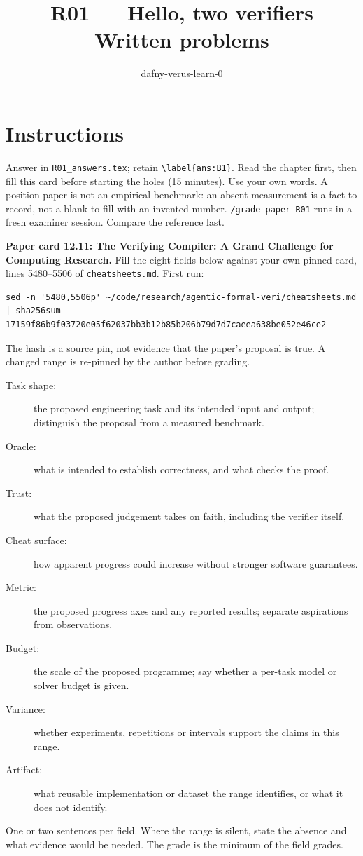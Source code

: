 \documentclass[11pt]{article}
\title{R01 --- Hello, two verifiers \\ \large Written problems}
\author{dafny-verus-learn-0}
\date{}
\begin{document}
\maketitle
\section*{Instructions}
Answer in \texttt{R01\_answers.tex}; retain \verb+\label{ans:B1}+.
Read the chapter first, then fill this card before starting the holes (15 minutes).
Use your own words. A position paper is not an empirical benchmark: an absent
measurement is a fact to record, not a blank to fill with an invented number.
\texttt{/grade-paper R01} runs in a fresh examiner session. Compare the reference last.

\begin{problem}\label{prob:B1}
\textbf{Paper card 12.11: The Verifying Compiler: A Grand Challenge for Computing
Research.} Fill the eight fields below against your own pinned card, lines 5480--5506 of \texttt{cheatsheets.md}. First run:
\begin{verbatim}
sed -n '5480,5506p' ~/code/research/agentic-formal-veri/cheatsheets.md | sha256sum
17159f86b9f03720e05f62037bb3b12b85b206b79d7d7caeea638be052e46ce2  -
\end{verbatim}
The hash is a source pin, not evidence that the paper's proposal is true.
A changed range is re-pinned by the author before grading.
\begin{description}
\item[Task shape:] the proposed engineering task and its intended input and output;
  distinguish the proposal from a measured benchmark.
\item[Oracle:] what is intended to establish correctness, and what checks the proof.
\item[Trust:] what the proposed judgement takes on faith, including the verifier itself.
\item[Cheat surface:] how apparent progress could increase without stronger software guarantees.
\item[Metric:] the proposed progress axes and any reported results; separate aspirations from observations.
\item[Budget:] the scale of the proposed programme; say whether a per-task model or solver budget is given.
\item[Variance:] whether experiments, repetitions or intervals support the claims in this range.
\item[Artifact:] what reusable implementation or dataset the range identifies, or what it does not identify.
\end{description}
One or two sentences per field. Where the range is silent, state the absence and
what evidence would be needed. The grade is the minimum of the field grades.
\end{problem}
\end{document}
